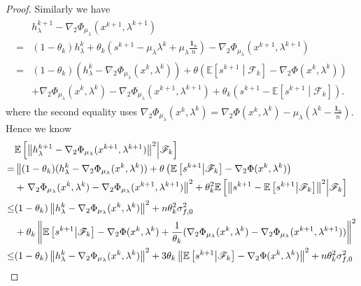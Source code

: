 \documentclass[10pt]{article}
\theoremstyle{remark}
\def\setF{\mathscr{F}} %
\newcommand{\E}{\mathbb{E}}
\newcommand{\norm}[1]{\left\|#1\right\|}
\newcommand{\bfone}{\mathbf{1}}
\begin{document}
\begin{proof}
Similarly we have
\begin{align}
    \begin{aligned}
        &h_{\lambda}^{k+1} - \nabla_2\Phi_{\mu_{\lambda}}(x^{k+1}, \lambda^{k+1}) \\
        = &(1 - \theta_k)h_{\lambda}^k + \theta_k\left(s^{k+1} - \mu_{\lambda}\lambda^k + \mu_{\lambda}\frac{\bfone_n}{n}\right) - \nabla_2\Phi_{\mu_{\lambda}}(x^{k+1}, \lambda^{k+1}) \\
        = &(1 - \theta_k)(h_{\lambda}^k - \nabla_2\Phi_{\mu_{\lambda}}(x^k, \lambda^k)) +  \theta\left(\E\left[s^{k+1}\middle|\setF_k\right] - \nabla_2\Phi(x^k,\lambda^k)\right) \\
        & + \nabla_2\Phi_{\mu_{\lambda}}(x^k, \lambda^k) - \nabla_2\Phi_{\mu_{\lambda}}(x^{k+1}, \lambda^{k+1}) +  \theta_k(s^{k+1} - \E\left[s^{k+1}\middle|\setF_k\right]).
    \end{aligned}
\end{align}
where the second equality uses $\nabla_2\Phi_{\mu_{\lambda}}(x^k, \lambda^k) = \nabla_2\Phi(x^k, \lambda^k) - \mu_{\lambda}\left(\lambda^k - \frac{\bfone_n}{n}\right)$. Hence we know
\begin{align}
        &\E\left[\norm{h_{\lambda}^{k+1} - \nabla_2\Phi_{\mu_{\lambda}}(x^{k+1}, \lambda^{k+1})}^2\middle|\setF_k\right] \notag\\
        = &\left\|(1 - \theta_k)(h_{\lambda}^k - \nabla_2\Phi_{\mu_{\lambda}}(x^k, \lambda^k)) + \theta\left(\E\left[s^{k+1}\middle|\setF_k\right] - \nabla_2\Phi(x^k,\lambda^k)\right) \right. \notag\\
        & + \left. \nabla_2\Phi_{\mu_{\lambda}}(x^k, \lambda^k) - \nabla_2\Phi_{\mu_{\lambda}}(x^{k+1}, \lambda^{k+1})\right\|^2 + \theta_k^2\E\left[\norm{s^{k+1} - \E\left[s^{k+1}\middle|\setF_k\right]}^2\middle|\setF_k\right]\notag\\ 
        \leq &(1 - \theta_k)\norm{h_{\lambda}^k - \nabla_2\Phi_{\mu_{\lambda}}(x^k, \lambda^k)}^2 + n\theta_k^2\sigma_{f,0}^2\notag\\
        & + \theta_k\norm{\E\left[s^{k+1}\middle|\setF_k\right] - \nabla_2\Phi(x^k,\lambda^k) + \frac{1}{\theta_k}(\nabla_2\Phi_{\mu_{\lambda}}(x^k, \lambda^k) - \nabla_2\Phi_{\mu_{\lambda}}(x^{k+1}, \lambda^{k+1}))}^2 \notag\\
        \leq &(1 - \theta_k)\norm{h_{\lambda}^k - \nabla_2\Phi_{\mu_{\lambda}}(x^k, \lambda^k)}^2 + 3\theta_k\norm{\E\left[s^{k+1}\middle|\setF_k\right] - \nabla_2\Phi(x^k,\lambda^k)}^2 + n\theta_k^2\sigma_{f,0}^2 \notag\\

\end{align}
\end{proof}
\end{document}
